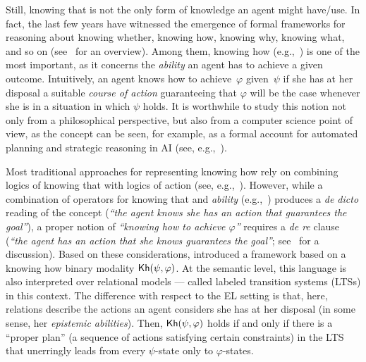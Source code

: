 Still, knowing that is not the only form of knowledge an agent might have/use. In fact, the last few years have witnessed the emergence of formal frameworks for reasoning about knowing whether, knowing how, knowing why, knowing what, and so on (see~\cite{Wang16} for an overview). Among them, knowing how (e.g.,~\cite{Pavese22}) is one of the most important, as it concerns the \emph{ability} an agent has to achieve a given outcome. Intuitively, an agent knows how to achieve~$\varphi$ given~$\psi$ if she has at her disposal a suitable \emph{course of action} guaranteeing that $\varphi$ will be the case whenever she is in a situation in which $\psi$ holds. It is worthwhile to study  this notion not only from a philosophical perspective, but also from a computer science point of view, as the concept can be seen, for example, as a formal account for automated planning and strategic reasoning in AI (see, e.g.,~\cite{KandA15}).

Most traditional approaches for representing knowing how rely on combining logics of knowing that with logics of action (see, e.g.,~\cite{Mccarthy69,Les00,HerzigT06}). However, while a combination of operators for knowing that and \emph{ability} (e.g.,~\cite{wiebeetal:2003}) produces a \emph{de dicto} reading of the concept (\emph{``the agent knows she has an action that guarantees the goal''}), a proper notion of \emph{``knowing how to achieve $\varphi$''} requires a \emph{de re} clause (\emph{``the agent has an action that she knows guarantees the goal''}; see~\cite{JamrogaA07,Herzig15} for a discussion). Based on these considerations, \cite{Wang15lori,Wang2016} introduced a framework based on a knowing how binary modality ${\sf Kh}(\psi,\varphi)$. At the semantic level, this language is also interpreted over relational models --- called labeled transition systems (LTSs) in this context. The difference with respect to the EL setting is that, here, relations describe the actions an agent considers she has at her disposal (in some sense, her \emph{epistemic abilities}).
Then, ${\sf Kh}(\psi,\varphi)$ holds if and only if there is a ``proper plan'' (a sequence of actions satisfying certain constraints) in the LTS that unerringly leads from every $\psi$-state only to $\varphi$-states.


